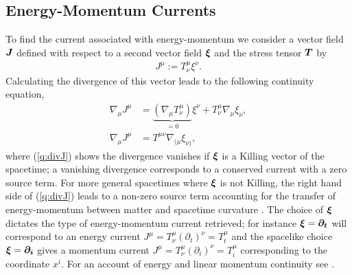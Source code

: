 \subsection{Energy-Momentum Currents} \label{q:sect:mattercont}
To find the current associated with energy-momentum we consider a vector field $\boldsymbol{J}$ defined with respect to a second vector field $\boldsymbol{\xi}$ and the stress tensor $\boldsymbol{T}$ by
\begin{align}
\label{q:Killing current}J^\mu := T^\mu_\nu \xi^\nu. 
\end{align}
Calculating the divergence of this vector leads to the following continuity equation,
\begin{align}
\nabla_\mu J^\mu &= \underbrace{(\nabla_\mu T^\mu_\nu )}_{=0}\xi^\nu + T^\mu_\nu \nabla_\mu  \xi_\nu, \\
\label{q:divJ}\nabla_\mu J^\mu &= T^{\mu\nu} \nabla_{(\mu}  \xi_{\nu)},
\end{align}
where (\ref{q:divJ}) shows the divergence vanishes if $\boldsymbol{\xi}$ is a Killing vector of the spacetime; a vanishing divergence corresponds to a conserved current with a zero source term. For more general spacetimes where $\boldsymbol{\xi}$ is not Killing, the right hand side of (\ref{q:divJ}) leads to a non-zero source term accounting for the transfer of energy-momentum between matter and spacetime curvature \cite{Clough_2021}. The choice of $\boldsymbol{\xi}$ dictates the type of energy-momentum current retrieved; for instance $\boldsymbol{\xi} = \boldsymbol{\partial_t}$ will correspond to an energy current $J^\mu = T^\mu_\nu (\partial_t)^\nu = T^\mu_t$ and the spacelike choice $\boldsymbol{\xi} = \boldsymbol{\partial_i}$ gives a momentum current $J^\mu = T^\mu_\nu (\partial_i)^\nu=T^\mu_i$ corresponding to the coordinate $x^i$. For an account of energy and linear momentum continuity see \cite{Clough_2021}.




